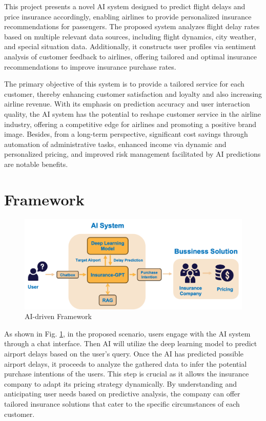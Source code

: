 \documentclass[conference]{IEEEtran}
\begin{document}
This project presents a novel AI system designed to predict flight delays and price insurance accordingly, enabling airlines to provide personalized insurance recommendations for passengers. The proposed system analyzes flight delay rates based on multiple relevant data sources, including flight dynamics, city weather, and special situation data. Additionally, it constructs user profiles via sentiment analysis of customer feedback to airlines, offering tailored and optimal insurance recommendations to improve insurance purchase rates.

The primary objective of this system is to provide a tailored service for each customer, thereby enhancing customer satisfaction and loyalty and also increasing airline revenue. With its emphasis on prediction accuracy and user interaction quality, the AI system has the potential to reshape customer service in the airline industry, offering a competitive edge for airlines and promoting a positive brand image. Besides, from a long-term perspective, significant cost savings through automation of administrative tasks, enhanced income via dynamic and personalized pricing, and improved risk management facilitated by AI predictions are notable benefits.

\section{Framework}

\begin{figure}[h]
    \centering
    \includegraphics[width=1\linewidth]{image.png}
    \caption{AI-driven Framework}
    \label{fig:Framework}
\end{figure}

As shown in Fig. \ref{fig:Framework}, in the proposed scenario, users engage with the AI system through a chat interface. Then AI will utilize the deep learning model to predict airport delays based on the user's query. Once the AI has predicted possible airport delays, it proceeds to analyze the gathered data to infer the potential purchase intentions of the users. This step is crucial as it allows the insurance company to adapt its pricing strategy dynamically. By understanding and anticipating user needs based on predictive analysis, the company can offer tailored insurance solutions that cater to the specific circumstances of each customer.
\end{document}
